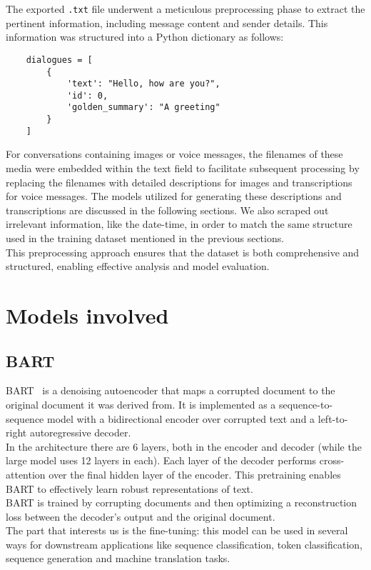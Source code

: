 \documentclass[10pt,twocolumn,letterpaper]{article}
\begin{document}
\hspace{1em}The exported \texttt{.txt} file underwent a meticulous preprocessing phase to extract the pertinent information, including message content and sender details. 
This information was structured into a Python dictionary as follows:

\begin{lstlisting}
    dialogues = [
        {
            'text': "Hello, how are you?",
            'id': 0,
            'golden_summary': "A greeting"
        }
    ]
\end{lstlisting}
For conversations containing images or voice messages, the filenames of these media were embedded within the text field to facilitate subsequent processing by replacing the filenames with detailed descriptions for images and transcriptions for voice messages. 
The models utilized for generating these descriptions and transcriptions are discussed in the following sections.
We also scraped out irrelevant information, like the date-time, in order to match the same structure used in the training dataset mentioned in the previous sections. \\
This preprocessing approach ensures that the dataset is both comprehensive and structured, enabling effective analysis and model evaluation.

\section{Models involved}

\subsection{BART}

BART~\cite{lewis2019bart} is a denoising autoencoder that maps a corrupted document to the original document it was derived from. It is implemented as a sequence-to-sequence model with a bidirectional encoder over 
corrupted text and a left-to-right autoregressive decoder. \\
In the architecture there are 6 layers, both in the encoder and decoder (while the large model uses 12 layers in each). Each layer of the decoder performs cross-attention over the final hidden layer of the 
encoder. This pretraining enables BART to effectively learn robust representations of text.\\
BART is trained by corrupting documents and then optimizing a reconstruction loss between the decoder's output and the original document. \\
The part that interests us is the fine-tuning: this model can be used in several ways for downstream applications like sequence classification, token classification, sequence generation and machine translation tasks. 
\end{document}
